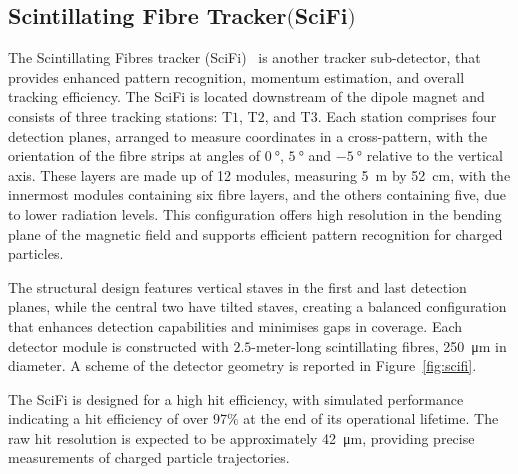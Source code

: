 \subsection[Scintillating Fibre Tracker]{Scintillating Fibre Tracker$ \bigl($SciFi$\bigr)$}
The Scintillating Fibres tracker (SciFi)~\cite{scifi} is another tracker sub-detector, that provides enhanced pattern recognition, momentum estimation, and overall tracking efficiency.
The SciFi is located downstream of the dipole magnet and consists of three tracking stations: T$1$, T$2$, and T$3$. Each station comprises four detection planes, arranged to measure coordinates in a cross-pattern, with the orientation of the fibre strips at angles of $\SI{0}{\degree}$, $\SI{+5}{\degree}$ and $\SI{-5}{\degree}$ relative to the vertical axis. These layers are made up of 12 modules, measuring \SI{5}{\meter} by \SI{52}{\centi\meter}, with the innermost modules containing six fibre layers, and the others containing five, due to lower radiation levels. This configuration offers high resolution in the bending plane of the magnetic field and supports efficient pattern recognition for charged particles.

The structural design features vertical staves in the first and last detection planes, while the central two have tilted staves, creating a balanced configuration that enhances detection capabilities and minimises gaps in coverage. Each detector module is constructed with $2.5$-meter-long scintillating fibres, \SI{250}{\micro\meter} in diameter. 
A scheme of the detector geometry is reported in Figure~\ref{fig:scifi}.


The SciFi is designed for a high hit efficiency, with simulated performance indicating a hit efficiency of over 97\% at the end of its operational lifetime. The raw hit resolution is expected to be approximately \SI{42}{\micro\meter}, providing precise measurements of charged particle trajectories.

